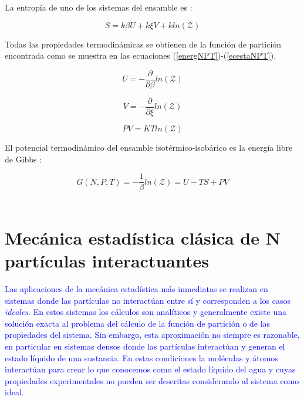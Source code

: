 La entropía de uno de los sistemas del ensamble es \cite{mcquarrie1976}:

\begin{equation} \label{entrpnpt}
    S = k\beta U + k\xi V + kln(\mathcal{Z})
\end{equation}

Todas las propiedades termodinámicas se obtienen de la función de partición encontrada como se muestra en las ecuaciones (\ref{energNPT})-(\ref{ecestaNPT}).

\begin{equation} \label{energNPT}
    U=-\frac{\partial}{\partial \beta}ln(\mathcal{Z})
\end{equation}

\begin{equation} \label{volNPT}
    V=-\frac{\partial}{\partial \xi}ln(\mathcal{Z})
\end{equation}

\begin{equation} \label{ecestaNPT}
    PV=KTln(\mathcal{Z})
\end{equation}

El potencial termodinámico del ensamble isotérmico-isobárico es la energía libre de Gibbs \cite{mcquarrie1976}:

\begin{equation} \label{potgibbs}
    G(N,P,T)=-\frac{1}{\beta}ln(\mathcal{Z})=U-TS+PV
\end{equation}\\

\section{Mecánica estadística clásica de N partículas interactuantes} \label{MecClasNpart}

\textcolor{blue}{
Las aplicaciones de la mecánica estadística más inmediatas se realizan en sistemas donde las partículas no interactúan entre sí y corresponden a los casos \textit{ideales}. En estos sistemas los cálculos son analíticos y generalmente existe una solución exacta al problema del cálculo de la función de partición o de las propiedades del sistema. Sin embargo, esta aproximación no siempre es razonable, en particular en sistemas densos donde las partículas interactúan y generan el estado líquido de una sustancia. En estas condiciones la moléculas y átomos interactúan para crear lo que conocemos como el estado líquido del agua y cuyas propiedades experimentales no pueden ser descritas considerando al sistema como ideal.}\\

